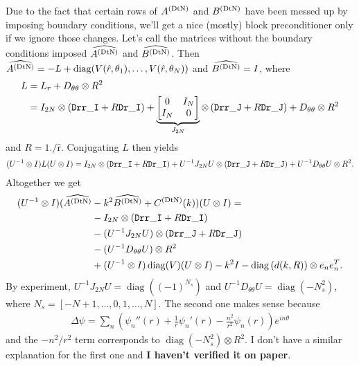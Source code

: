 Due to the fact that certain rows of $A^{(\text{DtN})}$ and $B^{(\text{DtN})}$ have been
messed up by imposing boundary conditions, we'll get a nice
(mostly) block preconditioner only if we ignore those changes.
Let's call the matrices without the boundary conditions imposed
$\widehat{A^{(\text{DtN})}}$ and $\widehat{B^{(\text{DtN})}}$. Then
$\widehat{A^{(\text{DtN})}} = -L + \operatorname{diag}(V(\hat{r},\theta_1), \hdots ,
V(\hat{r},\theta_N))$ and $\widehat{B^{(\text{DtN})}} = I$, where
\begin{align*}
L &= L_r + D_{\theta\theta} \otimes R^2 \\
  &= I_{2N} \otimes \left({\tt Drr\_I} + R {\tt Dr\_I} \right) +
     \underbrace{
     \begin{bmatrix} 0 & I_N \\ I_N & 0\end{bmatrix}
     }_{J_{2N}}
     \otimes \left({\tt Drr\_J} + R {\tt Dr\_J} \right) +
     D_{\theta\theta} \otimes R^2
\end{align*}
and $R = \operatorname{1./\hat{r}}$.
Conjugating $L$ then yields
\begin{align*}
(U^{-1} \otimes I)L(U \otimes I) =
         I_{2N}   \otimes \left({\tt Drr\_I} + R {\tt Dr\_I} \right) +
  U^{-1} J_{2N} U \otimes \left({\tt Drr\_J} + R {\tt Dr\_J} \right) +
  U^{-1} D_{\theta\theta} U \otimes R^2.
\end{align*}
Altogether we get
\begin{align*}
(U^{-1} \otimes I)
(\widehat{A^{(\text{DtN})}} &- k^2 \widehat{B^{(\text{DtN})}} + C^{(\text{DtN})}(k))
(U \otimes I) = \\ 
  & -         I_{2N}    \otimes \left({\tt Drr\_I} + R {\tt Dr\_I} \right) \\
  & - (U^{-1} J_{2N} U) \otimes \left({\tt Drr\_J} + R {\tt Dr\_J} \right) \\
  & - (U^{-1} D_{\theta\theta} U) \otimes R^2 \\
  & + (U^{-1} \otimes I)\operatorname{diag}(V)(U \otimes I)
  - k^2 I - \operatorname{diag}\left(d(k,R)\right) \otimes e_n e_n^T.
\end{align*}
By experiment,
$U^{-1} J_{2N} U = \operatorname{diag}( (-1)^{N_s})$ and
$U^{-1} D_{\theta\theta} U = \operatorname{diag}( -N_s^2 )$,
where $N_s = [-N + 1 , \hdots , 0, 1, \hdots , N]$.
The second one makes sense because
\begin{align*}
 \Delta\psi
 = \sum_n \left(\psi_n''(r) + \frac{1}{r}\psi_n'(r)
                            - \frac{n^2}{r^2}\psi_n(r)\right)e^{in\theta}
\end{align*}
and the $-n^2/r^2$ term corresponds to
$\operatorname{diag}(-N_s^2) \otimes R^2$. I don't have a similar explanation
for the first one and {\bf I haven't verified it on paper}.

